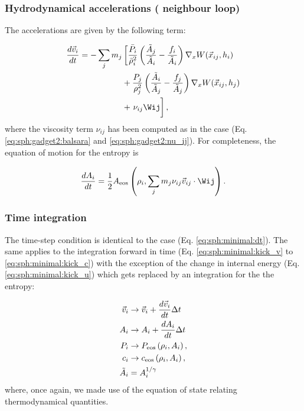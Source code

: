 \subsubsection{Hydrodynamical accelerations ( neighbour loop)}

The accelerations are given by the following term:

\begin{align}
  \frac{d\vec{v}_i}{dt} = -\sum_j m_j &\left[\frac{\bar P_i}{\bar\rho_i^2}
\left(\frac{\tilde A_j}{\tilde A_i} - \frac{f_i}{\tilde A_i}\right)\nabla_x
W(\vec{x}_{ij}, h_i) \right.  \nonumber \\
  &+\frac{P_j}{\rho_j^2} \left(\frac{\tilde A_i}{\tilde A_j} -
\frac{f_j}{\tilde A_j}\right)\nabla_x W(\vec{x}_{ij},h_j) \\
  &+ \left. \bigg.\nu_{ij} \Wij \right], \label{eq:sph:pe:dv_dt}
\end{align}
where the viscosity term $\nu_{ij}$ has been computed as in
the \GadgetSPH case (Eq. \ref{eq:sph:gadget2:balsara}
and \ref{eq:sph:gadget2:nu_ij}). For completeness, the equation of
motion for the entropy is

\begin{equation}
\frac{dA_i}{dt} = \frac{1}{2} A_{\rm eos}\left(\rho_i, \sum_j
m_j \nu_{ij}\vec{v}_{ij}\cdot \Wij\right).
\end{equation}

\subsubsection{Time integration}

The time-step condition is identical to the \MinimalSPH case
(Eq. \ref{eq:sph:minimal:dt}). The same applies to the integration
forward in time (Eq. \ref{eq:sph:minimal:kick_v} to
\ref{eq:sph:minimal:kick_c}) with the exception of the change in
internal energy (Eq. \ref{eq:sph:minimal:kick_u}) which gets replaced
by an integration for the the entropy:

\begin{align}
  \vec{v}_i &\rightarrow \vec{v}_i + \frac{d\vec{v}_i}{dt} \Delta t 
\label{eq:sph:pe:kick_v}\\
  A_i &\rightarrow A_i + \frac{dA_i}{dt} \Delta t \label{eq:sph:pe:kick_A}\\
  P_i &\rightarrow P_{\rm eos}\left(\rho_i, A_i\right)
\label{eq:sph:pe:kick_P}, \\
  c_i &\rightarrow c_{\rm eos}\left(\rho_i,
  A_i\right) \label{eq:sph:pe:kick_c}, \\
  \tilde A_i &= A_i^{1/\gamma}
\end{align}
where, once again, we made use of the equation of state relating
thermodynamical quantities.



